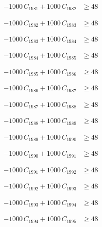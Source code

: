 \documentclass[a4paper,11pt]{article}
\begin{document}
\begin{align}
-1000\,C_{1981} + 1000\,C_{1982} &\geq 48 \nonumber
\end{align}

\begin{align}
-1000\,C_{1982} + 1000\,C_{1983} &\geq 48 \nonumber
\end{align}

\begin{align}
-1000\,C_{1983} + 1000\,C_{1984} &\geq 48 \nonumber
\end{align}

\begin{align}
-1000\,C_{1984} + 1000\,C_{1985} &\geq 48 \nonumber
\end{align}

\begin{align}
-1000\,C_{1985} + 1000\,C_{1986} &\geq 48 \nonumber
\end{align}

\begin{align}
-1000\,C_{1986} + 1000\,C_{1987} &\geq 48 \nonumber
\end{align}

\begin{align}
-1000\,C_{1987} + 1000\,C_{1988} &\geq 48 \nonumber
\end{align}

\begin{align}
-1000\,C_{1988} + 1000\,C_{1989} &\geq 48 \nonumber
\end{align}

\begin{align}
-1000\,C_{1989} + 1000\,C_{1990} &\geq 48 \nonumber
\end{align}

\begin{align}
-1000\,C_{1990} + 1000\,C_{1991} &\geq 48 \nonumber
\end{align}

\begin{align}
-1000\,C_{1991} + 1000\,C_{1992} &\geq 48 \nonumber
\end{align}

\begin{align}
-1000\,C_{1992} + 1000\,C_{1993} &\geq 48 \nonumber
\end{align}

\begin{align}
-1000\,C_{1993} + 1000\,C_{1994} &\geq 48 \nonumber
\end{align}

\begin{align}
-1000\,C_{1994} + 1000\,C_{1995} &\geq 48 \nonumber
\end{align}
\end{document}
